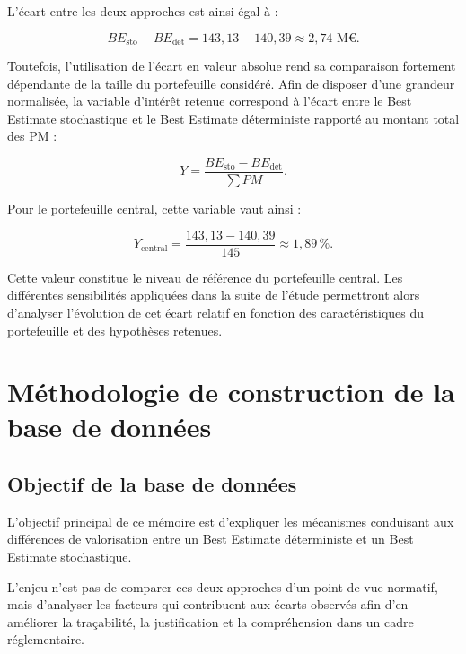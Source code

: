 L'écart entre les deux approches est ainsi égal à :

\begin{equation}
    BE_{\mathrm{sto}} - BE_{\mathrm{det}}
    = 143{,}13 - 140{,}39
    \approx 2{,}74 \text{ M}\euro.
\end{equation}

Toutefois, l'utilisation de l'écart en valeur absolue rend sa comparaison fortement dépendante de la taille du portefeuille considéré. Afin de disposer d'une grandeur normalisée, la variable d'intérêt retenue correspond à l'écart entre le Best Estimate stochastique et le Best Estimate déterministe rapporté au montant total des PM :

\begin{equation}
    Y =
    \frac{BE_{\mathrm{sto}}-BE_{\mathrm{det}}}
    {\sum PM}.
    \label{eq:variable_cible}
\end{equation}

Pour le portefeuille central, cette variable vaut ainsi :

\begin{equation}
    Y_{\mathrm{central}}
    =
    \frac{143{,}13 - 140{,}39}{145}
    \approx 1{,}89\,\%.
\end{equation}

Cette valeur constitue le niveau de référence du portefeuille central. Les différentes sensibilités appliquées dans la suite de l'étude permettront alors d'analyser l'évolution de cet écart relatif en fonction des caractéristiques du portefeuille et des hypothèses retenues.

\section{Méthodologie de construction de la base de données}

\subsection{Objectif de la base de données}

L'objectif principal de ce mémoire est d'expliquer les mécanismes conduisant aux différences de valorisation entre un Best Estimate déterministe et un Best Estimate stochastique.

L'enjeu n'est pas de comparer ces deux approches d'un point de vue normatif, mais d'analyser les facteurs qui contribuent aux écarts observés afin d'en améliorer la traçabilité, la justification et la compréhension dans un cadre réglementaire.

